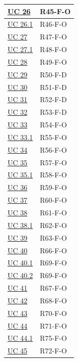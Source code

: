 {\begin{longtable}{|>{\raggedright\arraybackslash}p{3.0cm}|>{\raggedright\arraybackslash}p{12.6cm}|}
    \hyperref[uc:26]{UC 26} & \mbox{R45-F-O} \\ \hline
    \hyperref[uc:26.1]{UC 26.1} & \mbox{R46-F-O} \\ \hline
    \hyperref[uc:27]{UC 27} & \mbox{R47-F-O} \\ \hline
    \hyperref[uc:27.1]{UC 27.1} & \mbox{R48-F-O} \\ \hline
    \hyperref[uc:28]{UC 28} & \mbox{R49-F-O} \\ \hline
    \hyperref[uc:29]{UC 29} & \mbox{R50-F-D} \\ \hline
    \hyperref[uc:30]{UC 30} & \mbox{R51-F-D} \\ \hline
    \hyperref[uc:31]{UC 31} & \mbox{R52-F-D} \\ \hline
    \hyperref[uc:32]{UC 32} & \mbox{R53-F-D} \\ \hline
    \hyperref[uc:33]{UC 33} & \mbox{R54-F-O} \\ \hline
    \hyperref[uc:33.1]{UC 33.1} & \mbox{R55-F-O} \\ \hline
    \hyperref[uc:34]{UC 34} & \mbox{R56-F-O} \\ \hline
    \hyperref[uc:35]{UC 35} & \mbox{R57-F-O} \\ \hline
    \hyperref[uc:35.1]{UC 35.1} & \mbox{R58-F-O} \\ \hline
    \hyperref[uc:36]{UC 36} & \mbox{R59-F-O} \\ \hline
    \hyperref[uc:37]{UC 37} & \mbox{R60-F-O} \\ \hline
    \hyperref[uc:38]{UC 38} & \mbox{R61-F-O} \\ \hline
    \hyperref[uc:38.1]{UC 38.1} & \mbox{R62-F-O} \\ \hline
    \hyperref[uc:39]{UC 39} & \mbox{R63-F-O} \\ \hline
    \hyperref[uc:40]{UC 40} & \mbox{R66-F-O} \\ \hline
    \hyperref[uc:40.1]{UC 40.1} & \mbox{R69-F-O} \\ \hline
    \hyperref[uc:40.2]{UC 40.2} & \mbox{R69-F-O} \\ \hline
    \hyperref[uc:41]{UC 41} & \mbox{R67-F-O} \\ \hline
    \hyperref[uc:42]{UC 42} & \mbox{R68-F-O} \\ \hline
    \hyperref[uc:43]{UC 43} & \mbox{R70-F-O} \\ \hline
    \hyperref[uc:44]{UC 44} & \mbox{R71-F-O} \\ \hline
    \hyperref[uc:44.1]{UC 44.1} & \mbox{R75-F-O} \\ \hline
    \hyperref[uc:45]{UC 45} & \mbox{R72-F-O} \\ \hline

\end{longtable}}
